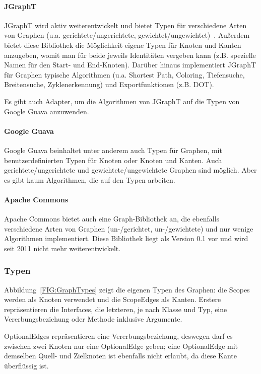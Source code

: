 \documentclass[../InterneDSLs.tex]{subfiles}
\begin{document}
\paragraph{JGraphT}
JGraphT wird aktiv weiterentwickelt und bietet Typen für verschiedene Arten von Graphen (u.a. gerichtete/ungerichtete, gewichtet/ungewichtet)~\cite{JGraphT}. Außerdem bietet diese Bibliothek die Möglichkeit eigene Typen für Knoten und Kanten anzugeben, womit man für beide jeweils Identitäten vergeben kann (z.B. spezielle Namen für den Start- und End-Knoten). Darüber hinaus implementiert JGraphT für Graphen typische Algorithmen (u.a. Shortest Path, Coloring, Tiefensuche, Breitensuche, Zyklenerkennung) und Exportfunktionen (z.B. DOT).

Es gibt auch Adapter, um die Algorithmen von JGraphT auf die Typen von Google Guava anzuwenden.

\paragraph{Google Guava}
Google Guava beinhaltet unter anderem auch Typen für Graphen, mit benutzerdefinierten Typen für Knoten oder Knoten und Kanten. Auch gerichtete/ungerichtete und gewichtete/ungewichtete Graphen sind möglich. Aber es gibt kaum Algorithmen, die auf den Typen arbeiten.

\paragraph{Apache Commons}
Apache Commons bietet auch eine Graph-Bibliothek an, die ebenfalls verschiedene Arten von Graphen (un-/gerichtet, un-/gewichtete) und nur wenige Algorithmen implementiert. Diese Bibliothek liegt als Version 0.1 vor und wird seit 2011 nicht mehr weiterentwickelt.

\subsubsection{Typen}
Abbildung~\ref{FIG:GraphTypes} zeigt die eigenen Typen des Graphen: die Scopes werden als Knoten verwendet und die ScopeEdges als Kanten. Erstere repräsentieren die Interfaces, die letzteren, je nach Klasse und Typ, eine Vererbungsbeziehung oder Methode inklusive Argumente.

OptionalEdges repräsentieren eine Vererbungsbeziehung, deswegen darf es zwischen zwei Knoten nur eine OptionalEdge geben; eine OptionalEdge mit demselben Quell- und Zielknoten ist ebenfalls nicht erlaubt, da diese Kante überflüssig ist.
\end{document}
